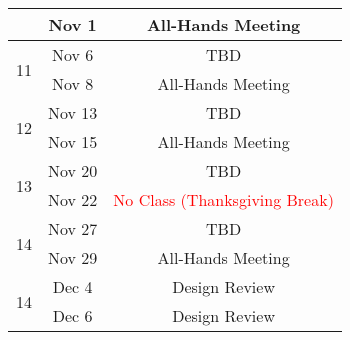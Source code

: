 \documentclass[11pt,letterpaper]{article}
\begin{document}
\begin{tabular}{c|c|c}
	 & Nov 1 & All-Hands Meeting \\
	 \hline
	\multirow{2}{*}{11}  & Nov 6 & TBD \\
	 & Nov 8 & All-Hands Meeting \\
	 \hline
	\multirow{2}{*}{12}  & Nov 13 & TBD \\
	 & Nov 15 & All-Hands Meeting \\
	 \hline
	\multirow{2}{*}{13}  & Nov 20 & TBD \\
	 & Nov 22 & \textcolor{red}{No Class (Thanksgiving Break)} \\
	 \hline
	\multirow{2}{*}{14}  & Nov 27 & TBD \\
	 & Nov 29 & All-Hands Meeting \\
	 \hline
	\multirow{2}{*}{14}  & Dec 4 & Design Review \\
	 & Dec 6 & Design Review \\
\end{tabular}
\end{document}
